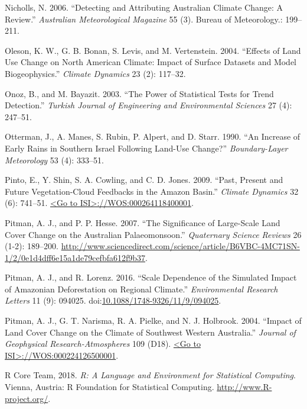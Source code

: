 \documentclass[fleqn,10pt,lineno]{wlpeerj} %
\begin{document}
\hypertarget{ref-Nicholls2006}{}
Nicholls, N. 2006. ``Detecting and Attributing Australian Climate
Change: A Review.'' \emph{Australian Meteorological Magazine} 55 (3).
Bureau of Meteorology.: 199--211.

\hypertarget{ref-Oleson2004}{}
Oleson, K. W., G. B. Bonan, S. Levis, and M. Vertenstein. 2004.
``Effects of Land Use Change on North American Climate: Impact of
Surface Datasets and Model Biogeophysics.'' \emph{Climate Dynamics} 23
(2): 117--32.

\hypertarget{ref-Onoz2003}{}
Onoz, B., and M. Bayazit. 2003. ``The Power of Statistical Tests for
Trend Detection.'' \emph{Turkish Journal of Engineering and
Environmental Sciences} 27 (4): 247--51.

\hypertarget{ref-Otterman1990}{}
Otterman, J., A. Manes, S. Rubin, P. Alpert, and D. Starr. 1990. ``An
Increase of Early Rains in Southern Israel Following Land-Use Change?''
\emph{Boundary-Layer Meteorology} 53 (4): 333--51.

\hypertarget{ref-Pinto2009}{}
Pinto, E., Y. Shin, S. A. Cowling, and C. D. Jones. 2009. ``Past,
Present and Future Vegetation-Cloud Feedbacks in the Amazon Basin.''
\emph{Climate Dynamics} 32 (6): 741--51.
\href{\%3CGo\%20to\%20ISI\%3E://WOS:000264118400001}{\textless{}Go to ISI\textgreater{}://WOS:000264118400001}.

\hypertarget{ref-Pitman2007}{}
Pitman, A. J., and P. P. Hesse. 2007. ``The Significance of Large-Scale
Land Cover Change on the Australian Palaeomonsoon.'' \emph{Quaternary
Science Reviews} 26 (1-2): 189--200.
\url{http://www.sciencedirect.com/science/article/B6VBC-4MC71SN-1/2/0e1d4dff6e15a1de79cefbfa612f9b37}.

\hypertarget{ref-pitman_scale_2016}{}
Pitman, A. J., and R. Lorenz. 2016. ``Scale Dependence of the Simulated
Impact of Amazonian Deforestation on Regional Climate.''
\emph{Environmental Research Letters} 11 (9): 094025.
doi:\href{https://doi.org/10.1088/1748-9326/11/9/094025}{10.1088/1748-9326/11/9/094025}.

\hypertarget{ref-Pitman2004}{}
Pitman, A. J., G. T. Narisma, R. A. Pielke, and N. J. Holbrook. 2004.
``Impact of Land Cover Change on the Climate of Southwest Western
Australia.'' \emph{Journal of Geophysical Research-Atmospheres} 109
(D18).
\href{\%3CGo\%20to\%20ISI\%3E://WOS:000224126500001}{\textless{}Go to ISI\textgreater{}://WOS:000224126500001}.

\hypertarget{ref-Rstats2018}{}
R Core Team, 2018. \emph{R: A Language and Environment for Statistical
Computing}. Vienna, Austria: R Foundation for Statistical Computing.
\url{http://www.R-project.org/}.
\end{document}
